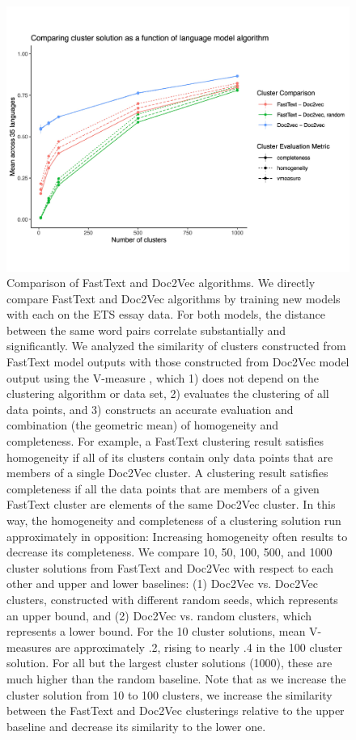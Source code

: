 \documentclass[9pt,twoside,lineno]{pnas-new}
\begin{document}
\pagebreak
 \clearpage

\begin{figure}[h]
\centering
     \includegraphics[width = 7in]{suppfigs/cluster_alogrithm_comparison.pdf}
         \caption{Comparison of FastText and Doc2Vec algorithms. We directly compare FastText and Doc2Vec algorithms by training new models with each on the ETS essay data. For both models, the distance between the same word pairs correlate substantially and significantly. We analyzed the similarity of clusters constructed from FastText model outputs with those constructed from Doc2Vec model output using the V-measure \cite{rosenberg2007v}, which 1) does not depend on the clustering algorithm or data set, 2) evaluates the clustering of all data points, and 3) constructs an accurate evaluation and combination (the geometric mean) of homogeneity and completeness. For example, a FastText clustering result satisfies homogeneity if all of its clusters contain only data points that are members of a single Doc2Vec cluster. A clustering result satisfies completeness if all the data points that are members of a given FastText cluster are elements of the same Doc2Vec cluster. In this way, the homogeneity and completeness of a clustering solution run approximately in opposition: Increasing homogeneity often results to decrease its completeness. We compare 10, 50, 100, 500, and 1000 cluster solutions from FastText and Doc2Vec with respect to each other and upper and lower baselines: (1) Doc2Vec vs. Doc2Vec clusters, constructed with different random seeds, which represents an upper bound, and (2) Doc2Vec vs. random clusters, which represents a lower bound. For the 10 cluster solutions, mean V-measures are approximately .2, rising to nearly .4 in the 100 cluster solution. For all but the largest cluster solutions (1000), these are much higher than the random baseline. Note that as we increase the cluster solution from 10 to 100 clusters, we increase the similarity between the FastText and Doc2Vec clusterings relative to the upper baseline and decrease its similarity to the lower one.
}
\end{figure}
\end{document}
